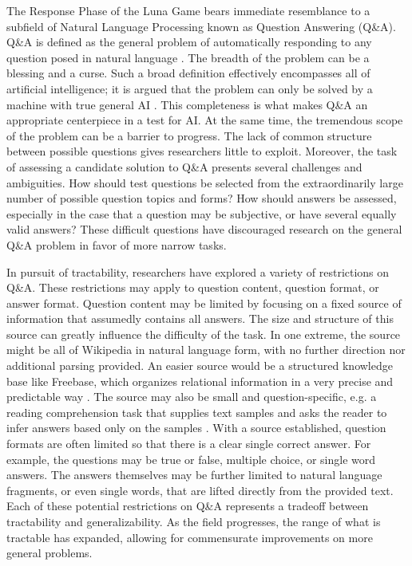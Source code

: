 The Response Phase of the Luna Game bears immediate resemblance to a subfield of Natural Language Processing known as Question Answering (Q\&A). Q\&A is defined as the general problem of automatically responding to any question posed in natural language  \citep{andrenucci2005automated, hirschman2001natural}. The breadth of the problem can be a blessing and a curse. Such a broad definition effectively encompasses all of artificial intelligence; it is argued that the problem can only be solved by a machine with true general AI  \citep{yampolskiy2013turing}. This completeness is what makes Q\&A an appropriate centerpiece in a test for AI. At the same time, the tremendous scope of the problem can be a barrier to progress. The lack of common structure between possible questions gives researchers little to exploit. Moreover, the task of assessing a candidate solution to Q\&A presents several challenges and ambiguities. How should test questions be selected from the extraordinarily large number of possible question topics and forms? How should answers be assessed, especially in the case that a question may be subjective, or have several equally valid answers? These difficult questions have discouraged research on the general Q\&A problem in favor of more narrow tasks.

In pursuit of tractability, researchers have explored a variety of restrictions on Q\&A. These restrictions may apply to question content, question format, or answer format. Question content may be limited by focusing on a fixed source of information that assumedly contains all answers. The size and structure of this source can greatly influence the difficulty of the task. In one extreme, the source might be all of Wikipedia in natural language form, with no further direction nor additional parsing provided. An easier source would be a structured knowledge base like Freebase, which organizes relational information in a very precise and predictable way  \citep{bollacker2008freebase}. The source may also be small and question-specific, e.g. a reading comprehension task that supplies text samples and asks the reader to infer answers based only on the samples  \citep{richardson2013mctest}. With a source established, question formats are often limited so that there is a clear single correct answer. For example, the questions may be true or false, multiple choice, or single word answers. The answers themselves may be further limited to natural language fragments, or even single words, that are lifted directly from the provided text. Each of these potential restrictions on Q\&A represents a tradeoff between tractability and generalizability. As the field progresses, the range of what is tractable has expanded, allowing for commensurate improvements on more general problems.

